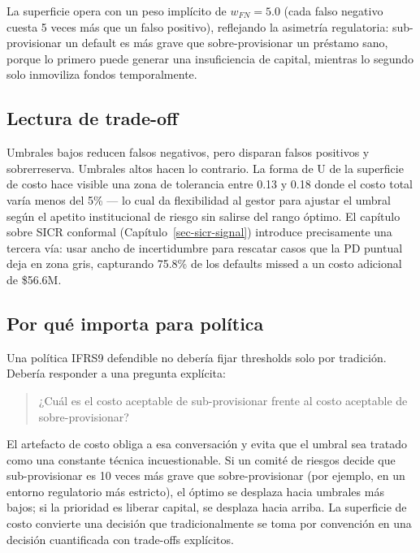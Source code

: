 \documentclass[
  spanish,
  11pt,
  letterpaper,
]{scrbook}
\theoremstyle{plain}
\theoremstyle{remark}
\begin{document}
La superficie opera con un peso implícito de \(w_{FN} = 5.0\) (cada
falso negativo cuesta 5 veces más que un falso positivo), reflejando la
asimetría regulatoria: sub-provisionar un default es más grave que
sobre-provisionar un préstamo sano, porque lo primero puede generar una
insuficiencia de capital, mientras lo segundo solo inmoviliza fondos
temporalmente.

\subsection{Lectura de trade-off}\label{lectura-de-trade-off}

Umbrales bajos reducen falsos negativos, pero disparan falsos positivos
y sobrerreserva. Umbrales altos hacen lo contrario. La forma de U de la
superficie de costo hace visible una zona de tolerancia entre 0.13 y
0.18 donde el costo total varía menos del 5\% --- lo cual da
flexibilidad al gestor para ajustar el umbral según el apetito
institucional de riesgo sin salirse del rango óptimo. El capítulo sobre
SICR conformal (Capítulo~\ref{sec-sicr-signal}) introduce precisamente
una tercera vía: usar ancho de incertidumbre para rescatar casos que la
PD puntual deja en zona gris, capturando 75.8\% de los defaults missed a
un costo adicional de \$56.6M.

\subsection{Por qué importa para
política}\label{por-quuxe9-importa-para-poluxedtica}

Una política IFRS9 defendible no debería fijar thresholds solo por
tradición. Debería responder a una pregunta explícita:

\begin{quote}
¿Cuál es el costo aceptable de sub-provisionar frente al costo aceptable
de sobre-provisionar?
\end{quote}

El artefacto de costo obliga a esa conversación y evita que el umbral
sea tratado como una constante técnica incuestionable. Si un comité de
riesgos decide que sub-provisionar es 10 veces más grave que
sobre-provisionar (por ejemplo, en un entorno regulatorio más estricto),
el óptimo se desplaza hacia umbrales más bajos; si la prioridad es
liberar capital, se desplaza hacia arriba. La superficie de costo
convierte una decisión que tradicionalmente se toma por convención en
una decisión cuantificada con trade-offs explícitos.
\end{document}
